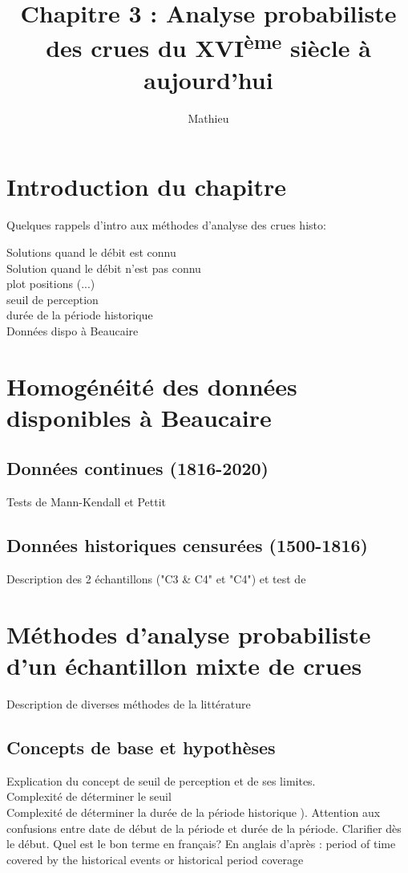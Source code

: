\documentclass[11pt]{article}
\title{Chapitre 3 : Analyse probabiliste des crues du XVI\textsuperscript{ème} siècle à aujourd'hui}
\author{Mathieu}
\begin{document}
\maketitle

\tableofcontents

\section{Introduction du chapitre}
	Quelques rappels d'intro aux méthodes d'analyse des crues histo:
	
	Solutions quand le débit est connu\\
	Solution quand le débit n'est pas connu	\\
	plot positions (\citet{hirsch_techniques_1982}...)	\\
	seuil de perception\\
	durée de la période historique\\
	Données dispo à Beaucaire
	
	
\section{Homogénéité des données disponibles à Beaucaire}

	\subsection{Données continues (1816-2020)}
		Tests de Mann-Kendall et Pettit
		
	\subsection{Données historiques censurées (1500-1816)}
		Description des 2 échantillons ("C3 \& C4" et "C4") et test de \citet{lang_towards_1999}
		
\section{Méthodes d'analyse probabiliste d'un échantillon mixte de crues}
	
	Description de diverses méthodes de la littérature
	
	\subsection{Concepts de base et hypothèses}
	Explication du concept de seuil de perception et de ses limites.\\
	Complexité de déterminer le seuil\\
	Complexité de déterminer la durée de la période historique \citep{prosdocimi_german_2018}). Attention aux confusions entre date de début de la période et durée de la période. Clarifier dès le début. Quel est le bon terme en français? En anglais d'après \citet{prosdocimi_german_2018}: period of time covered by the historical events or historical period coverage\\
	
\end{document}
